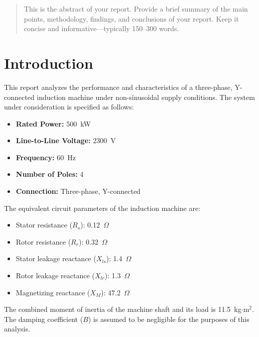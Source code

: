 \documentclass[12pt,a4paper]{report}
\begin{document}
\begin{abstract}
    This is the abstract of your report. Provide a brief summary of the main points, methodology, findings, and conclusions of your report. Keep it concise and informative---typically 150--300 words.
\end{abstract}

\tableofcontents
\newpage



\chapter{Introduction}
\label{ch:introduction}


This report analyzes the performance and characteristics of a three-phase, Y-connected induction machine under non-sinusoidal supply conditions. The system under consideration is specified as follows:

\begin{itemize}
    \item \textbf{Rated Power:} 500~kW
    \item \textbf{Line-to-Line Voltage:} 2300~V
    \item \textbf{Frequency:} 60~Hz
    \item \textbf{Number of Poles:} 4
    \item \textbf{Connection:} Three-phase, Y-connected
\end{itemize}

The equivalent circuit parameters of the induction machine are:
\begin{itemize}
    \item Stator resistance ($R_s$): 0.12~$\Omega$
    \item Rotor resistance ($R_r$): 0.32~$\Omega$
    \item Stator leakage reactance ($X_{ls}$): 1.4~$\Omega$
    \item Rotor leakage reactance ($X_{lr}$): 1.3~$\Omega$
    \item Magnetizing reactance ($X_M$): 47.2~$\Omega$
\end{itemize}

The combined moment of inertia of the machine shaft and its load is 11.5~kg$\cdot$m$^2$. The damping coefficient ($B$) is assumed to be negligible for the purposes of this analysis.
\end{document}

